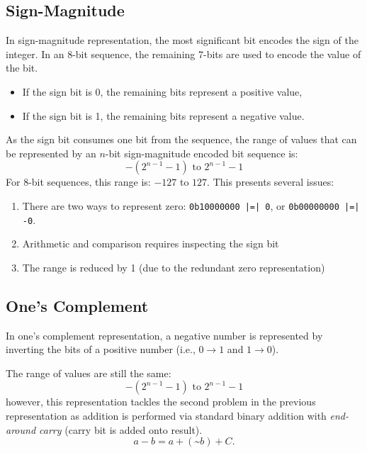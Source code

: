 \documentclass{report}
\begin{document}
\subsection{Sign-Magnitude}
In sign-magnitude representation, the most significant bit encodes the sign of the
integer. In an 8-bit sequence, the remaining 7-bits are used to
encode the value of the bit.
\begin{itemize}
    \item If the sign bit is 0, the remaining bits represent a positive value,
    \item If the sign bit is 1, the remaining bits represent a negative value.
\end{itemize}
As the sign bit consumes one bit from the sequence, the range of values that can be
represented by an \(n\)-bit sign-magnitude encoded bit sequence is:
\begin{equation*}
    -\left( 2^{n - 1} - 1 \right) \text{ to } 2^{n - 1} - 1
\end{equation*}
For 8-bit sequences, this range is: \(-127\) to \(127\).
This presents several issues:
\begin{enumerate}
    \item There are two ways to represent zero: \texttt{0b10000000 |=| 0}, or \texttt{0b00000000 |=| -0}.
    \item Arithmetic and comparison requires inspecting the sign bit
    \item The range is reduced by 1 (due to the redundant zero representation)
\end{enumerate}
\subsection{One's Complement}
In one's complement representation, a negative number is represented by
inverting the bits of a positive number (i.e., \(0 \to 1\) and \(1 \to 0\)).

The range of values are still the same:
\begin{equation*}
    -\left( 2^{n - 1} - 1 \right) \text{ to } 2^{n - 1} - 1
\end{equation*}
however, this representation tackles the second problem in the previous representation as
addition is performed via standard binary addition with \textit{end-around carry} (carry bit is added onto result).
\begin{equation*}
    a - b = a + \left( \text{\textasciitilde} b \right) + C.
\end{equation*}
\end{document}
